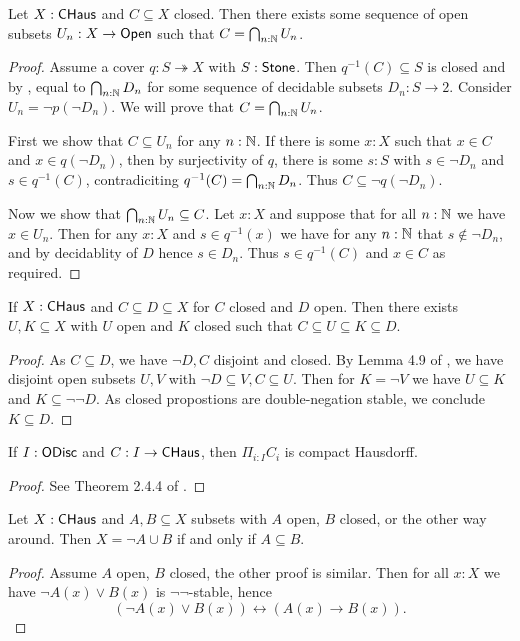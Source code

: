 \begin{lemma}\label{ClosedApproxByOpenIntersection}
  Let $X:\mathsf{CHaus}$ and $C\subseteq X$ closed. 
  Then there exists some sequence of open subsets $U_n:X \to \mathsf{Open}$ such that $C = \bigcap_{n:\mathbb{N}} U_n$. 
\end{lemma}
\begin{proof}
  Assume a cover $q:S\twoheadrightarrow X$ with $S:\mathsf{Stone}$. Then $q^{-1}(C)\subseteq S$ is closed and by \parencite[TODO]{TODO}, equal to $\bigcap_{n:\mathbb{N}} D_n$ for some sequence of decidable subsets $D_n: S \to 2$. 
  Consider $U_n = \neg p(\neg D_n)$. We will prove that $C = \bigcap_{n:\mathbb{N}} U_n$.
  \item First we show that $C\subseteq U_n$ for any $n:\mathbb{N}$. If there is some $x:X$ such that $x\in C$ and $x \in q(\neg D_n)$, then by surjectivity of $q$, there is some $s:S$ with $s\in \neg D_n$ and $s\in q^{-1}(C)$, contradiciting $q^{-1}(C)= \bigcap_{n:\mathbb{N}} D_n$. Thus $C\subseteq \neg q(\neg D_n)$. 
  \item Now we show that $\bigcap_{n:\mathbb{N}} U_n \subseteq C$. 
    Let $x:X$ and suppose that for all $n:\mathbb{N}$ we have $x\in U_n$. Then for any $x:X$ and $s\in q^{-1}(x)$ we have for any $n:\mathbb{N}$ that $s \notin \neg D_n$, and by decidablity of $D$ hence $s\in D_n$. Thus $s\in q^{-1}(C)$ and $x\in C$ as required. 
\end{proof}

\begin{lemma}\label{seperation}
  If $X:\mathsf{CHaus}$ and $C\subseteq D \subseteq X$ for $C$ closed and $D$ open. 
  Then there exists $U,K\subseteq X$ with $U$ open and $K$ closed such that $ C\subseteq U \subseteq K \subseteq D$. 
\end{lemma}
\begin{proof}
  As $C\subseteq D$, we have $\neg D, C$ disjoint and closed. By Lemma 4.9 of \cite{synthetic-stone-duality}, we have disjoint open subsets $U,V$ with $\neg D \subseteq V , C \subseteq U$. Then for $K = \neg V$ we have $U\subseteq K$ and $K \subseteq \neg \neg D$. As closed propostions are double-negation stable, we conclude $K\subseteq D$. 
\end{proof}

\begin{lemma}\label{Tychonov}
  If $I:\mathsf{ODisc}$ and $C:I \to \mathsf{CHaus}$, then $\Pi_{i:I} C_i$ is compact Hausdorff. 
\end{lemma}
\begin{proof}
  See Theorem 2.4.4 of \cite{condensed-cohomology}.
\end{proof}

\begin{lemma}\label{SubsetUnion}
  Let $X:\mathsf{CHaus}$ and $A, B \subseteq X$ subsets with $A$ open, $B$ closed, or the other way around. 
  Then $X = \neg A \cup B$ if and only if $A \subseteq B$. 
\end{lemma}
\begin{proof}
  Assume $A$ open, $B$ closed, the other proof is similar. Then for all $x:X$ we have $\neg A (x) \vee B(x)$ is $\neg\neg$-stable, hence
  $$(\neg A (x) \vee B (x)) \leftrightarrow (A(x) \to B(x)).$$
\end{proof}


